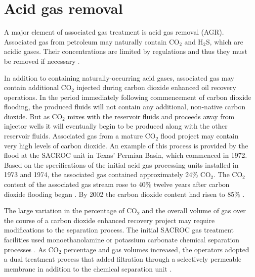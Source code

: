 \documentclass[11pt]{report}
\begin{document}
\begin{landscape}
\begin{tiny}
\begin{threeparttable}
\begin{supertabular*}{1\columnwidth}{p{0.05\columnwidth}p{0.2\columnwidth}p{0.25\columnwidth}p{0.05\columnwidth}p{0.1\columnwidth}p{0.09\columnwidth}p{0.05\columnwidth}p{0.025\columnwidth}}
\end{supertabular*}
\end{threeparttable}
\end{tiny}

\end{landscape}

\clearpage

\section{Acid gas removal}
\label{sec:AGR}

A major element of associated gas treatment is acid gas removal (AGR). Associated gas from petroleum may naturally contain CO$_{2}$ and H$_{2}$S, which are acidic gases. Their concentrations are limited by regulations and thus they must be removed if necessary \cite[p. 211-213]{FundNatGasProcessing}.

In addition to containing naturally-occurring acid gases, associated gas may contain additional CO$_{2}$ injected during carbon dioxide enhanced oil recovery operations. In the period immediately following commencement of carbon dioxide flooding, the produced fluids will not contain any additional, non-native carbon dioxide. But as CO$_{2}$ mixes with the reservoir fluids and proceeds away from injector wells it will eventually begin to be produced along with the other reservoir fluids. Associated gas from a mature CO$_{2}$ flood project may contain very high levels of carbon dioxide. An example of this process is provided by the flood at the SACROC unit in Texas' Permian Basin, which commenced in 1972. Based on the specifications of the initial acid gas processing units installed in 1973 and 1974, the associated gas contained approximately 24\% CO$_{2}$. The CO$_{2}$ content of the associated gas stream rose to 40\% twelve years after carbon dioxide flooding began \cite{Parro1984}. By 2002 the carbon dioxide content had risen to 85\% \cite{Guntis2002}.

The large variation in the percentage of CO$_{2}$ and the overall volume of gas over the course of a carbon dioxide enhanced recovery project may require modifications to the separation process. The initial SACROC gas treatment facilities used monoethanolamine or potassium carbonate chemical separation processes \cite{Guntis2002}. As CO$_{2}$ percentage and gas volumes increased, the operators adopted a dual treatment process that added filtration through a selectively permeable membrane in addition to the chemical separation unit \cite{Parro1984}.
\end{document}
